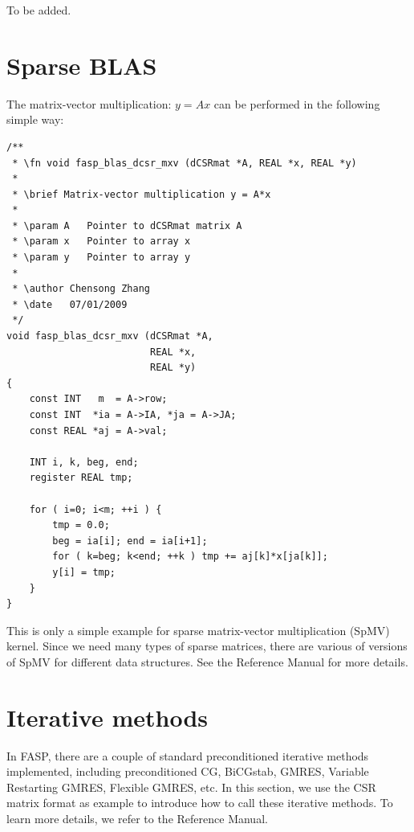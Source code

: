 \documentclass[11pt]{memoir}
\begin{document}
To be added.


\section{Sparse BLAS}

The matrix-vector multiplication: $y=Ax$ can be performed in the
following simple way:

\begin{lstlisting}
/**
 * \fn void fasp_blas_dcsr_mxv (dCSRmat *A, REAL *x, REAL *y)
 *
 * \brief Matrix-vector multiplication y = A*x
 *
 * \param A   Pointer to dCSRmat matrix A
 * \param x   Pointer to array x
 * \param y   Pointer to array y
 *
 * \author Chensong Zhang
 * \date   07/01/2009
 */
void fasp_blas_dcsr_mxv (dCSRmat *A,
                         REAL *x,
                         REAL *y)
{
    const INT   m  = A->row;
    const INT  *ia = A->IA, *ja = A->JA;
    const REAL *aj = A->val;

    INT i, k, beg, end;
    register REAL tmp;

    for ( i=0; i<m; ++i ) {
        tmp = 0.0;
        beg = ia[i]; end = ia[i+1];
        for ( k=beg; k<end; ++k ) tmp += aj[k]*x[ja[k]];
        y[i] = tmp;
    }
}
\end{lstlisting}

This is only a simple example for sparse matrix-vector multiplication (SpMV) kernel. Since we need many types of sparse matrices, there are various of versions of SpMV for different data structures. See the Reference Manual for more details.

\section{Iterative methods}\label{sec:iter}

In FASP, there are a couple of standard preconditioned iterative methods
~\cite{Saad.Saad.2003fv} implemented, including preconditioned CG, BiCGstab, GMRES, Variable Restarting GMRES, Flexible GMRES, etc. In this section, we use the CSR matrix format as example to introduce how to call these iterative methods. To learn more details, we refer to the Reference Manual.
\end{document}

